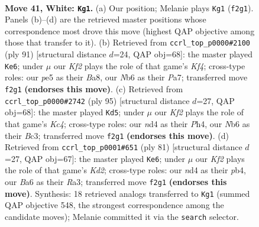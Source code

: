\documentclass[11pt]{article}
\begin{document}
\clearpage

\begin{figure}[p]\centering
\begin{subfigure}{0.46\textwidth}\centering
\resizebox{\linewidth}{!}{%
\newchessgame
\chessboard[
  setfen={8/6k1/BN6/4p1p1/3n1p2/5P2/3r1K2/8 w - - 4 41},
  showmover=false,
  pgfstyle=straightmove, color=movearrow, markmove={f2-g1}
]}
\caption{}
\end{subfigure}\hfill
\begin{subfigure}{0.46\textwidth}\centering
\resizebox{\linewidth}{!}{%
\newchessgame
\chessboard[
  setfen={b7/p7/8/5kpp/3K4/4N1P1/1P5P/8 b - - 3 46},
  showmover=false,
  pgfstyle=straightmove, color=movearrow, markmove={f5-e6}
]}
\caption{}
\end{subfigure}
\\[4pt]
\begin{subfigure}{0.46\textwidth}\centering
\resizebox{\linewidth}{!}{%
\newchessgame
\chessboard[
  setfen={8/8/8/2k2pp1/7p/1PbN3P/4K1P1/8 b - - 12 48},
  showmover=false,
  pgfstyle=straightmove, color=movearrow, markmove={c5-d5}
]}
\caption{}
\end{subfigure}\hfill
\begin{subfigure}{0.46\textwidth}\centering
\resizebox{\linewidth}{!}{%
\newchessgame
\chessboard[
  setfen={8/1R1k3p/6p1/6P1/1P3P2/r7/8/4K3 b - - 1 41},
  showmover=false,
  pgfstyle=straightmove, color=movearrow, markmove={d7-e6}
]}
\caption{}
\end{subfigure}
\caption{\textbf{Move 41, White: \texttt{Kg1}.} (a) Our position; Melanie plays \texttt{Kg1} (\texttt{f2g1}). Panels (b)--(d) are the retrieved master positions whose correspondence most drove this move (highest QAP objective among those that transfer to it). (b) Retrieved from \texttt{ccrl\_top\_p0000\#2100} (ply 91) [structural distance $d$=24, QAP obj=68]: the master played \texttt{Ke6}; under $\mu$ our \emph{Kf2} plays the role of that game's \emph{Kf4}; cross-type roles: our \emph{p}e5 as their \emph{B}a8, our \emph{N}b6 as their \emph{P}a7; transferred move \texttt{f2g1} \textbf{(endorses this move)}. (c) Retrieved from \texttt{ccrl\_top\_p0000\#2742} (ply 95) [structural distance $d$=27, QAP obj=68]: the master played \texttt{Kd5}; under $\mu$ our \emph{Kf2} plays the role of that game's \emph{Kc4}; cross-type roles: our \emph{n}d4 as their \emph{P}h4, our \emph{N}b6 as their \emph{B}c3; transferred move \texttt{f2g1} \textbf{(endorses this move)}. (d) Retrieved from \texttt{ccrl\_top\_p0001\#651} (ply 81) [structural distance $d$=27, QAP obj=67]: the master played \texttt{Ke6}; under $\mu$ our \emph{Kf2} plays the role of that game's \emph{Kd2}; cross-type roles: our \emph{n}d4 as their \emph{p}b4, our \emph{B}a6 as their \emph{R}a3; transferred move \texttt{f2g1} \textbf{(endorses this move)}. Synthesis: 18 retrieved analogs transferred to \texttt{Kg1} (summed QAP objective 548, the strongest correspondence among the candidate moves); Melanie committed it via the \texttt{search} selector.}
\label{fig:thought-m80}
\end{figure}
\end{document}
